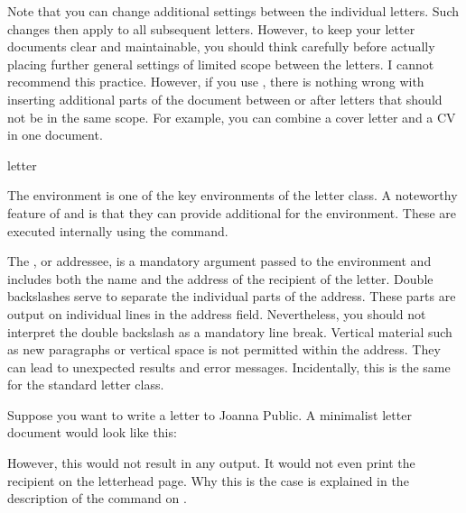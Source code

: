 Note that you can change additional settings between the individual letters.
Such changes then apply to all subsequent letters. However, to keep your
letter documents clear and maintainable, you should think carefully before
actually placing further general settings of limited scope between the
letters. I cannot recommend this practice. However, if you use
, there is nothing wrong with inserting additional parts
of the document between or after letters that should not be in the same scope.
For example, you can combine a cover letter and a CV in one document.

\begin{Declaration}
  \begin{Environment}{letter}
  \end{Environment}
\end{Declaration}
%
The  environment is one of the key environments of the
letter class. A noteworthy
feature of  and  is that they can provide
additional  for the  environment. These
 are executed internally using the
 command.

The , or addressee, is a mandatory argument passed to the
 environment and includes both the name and the address of
the recipient of the letter. Double backslashes serve to
separate the individual parts of the address. These parts are output on
individual lines in the address field. Nevertheless, you should not interpret
the double backslash as a mandatory line break. Vertical material such as new
paragraphs or vertical space is not permitted within the address. They can
lead to unexpected results and error messages. Incidentally, this is the same
for the standard letter class.

\begin{Example}
  \label{desc:\LabelBase.env.letter.example}%
  Suppose you want to write a letter to Joanna Public. A minimalist
  letter document would look like this:
  However, this would not result in any output. It would not even print the
  recipient on the letterhead page. Why this is the case is explained in the
  description of the  command on
  .
\end{Example}

